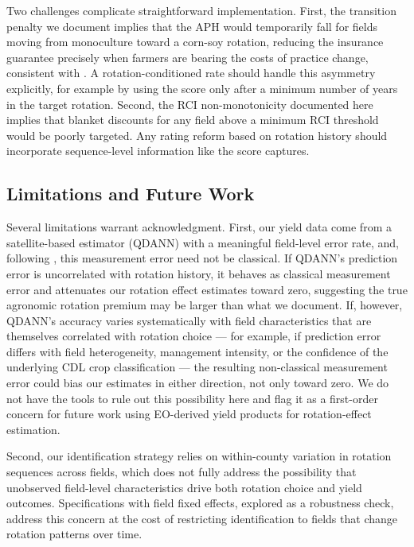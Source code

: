 \documentclass[12pt,letterpaper]{article}
\theoremstyle{remark}
\theoremstyle{remark}
\theoremstyle{plain}
\theoremstyle{definition}
\begin{document}
Two challenges complicate straightforward implementation. First, the transition penalty we document implies that the APH would temporarily fall for fields moving from monoculture toward a corn-soy rotation, reducing the insurance guarantee precisely when farmers are bearing the costs of practice change, consistent with \citet{Connor2022}. A rotation-conditioned rate should handle this asymmetry explicitly, for example by using the score only after a minimum number of years in the target rotation. Second, the RCI non-monotonicity documented here implies that blanket discounts for any field above a minimum RCI threshold would be poorly targeted. Any rating reform based on rotation history should incorporate sequence-level information like the score captures.
 
\subsection{\label{subsec:limitations}Limitations and Future Work}
 
Several limitations warrant acknowledgment. First, our yield data come from a satellite-based estimator (QDANN) with a meaningful field-level error rate, and, following \citet{Benami2026}, this measurement error need not be classical. If QDANN's prediction error is uncorrelated with rotation history, it behaves as classical measurement error and attenuates our rotation effect estimates toward zero, suggesting the true agronomic rotation premium may be larger than what we document. If, however, QDANN's accuracy varies systematically with field characteristics that are themselves correlated with rotation choice --- for example, if prediction error differs with field heterogeneity, management intensity, or the confidence of the underlying CDL crop classification --- the resulting non-classical measurement error could bias our estimates in either direction, not only toward zero. We do not have the tools to rule out this possibility here and flag it as a first-order concern for future work using EO-derived yield products for rotation-effect estimation.
 
Second, our identification strategy relies on within-county variation in rotation sequences across fields, which does not fully address the possibility that unobserved field-level characteristics drive both rotation choice and yield outcomes. Specifications with field fixed effects, explored as a robustness check, address this concern at the cost of restricting identification to fields that change rotation patterns over time.
 
\end{document}
